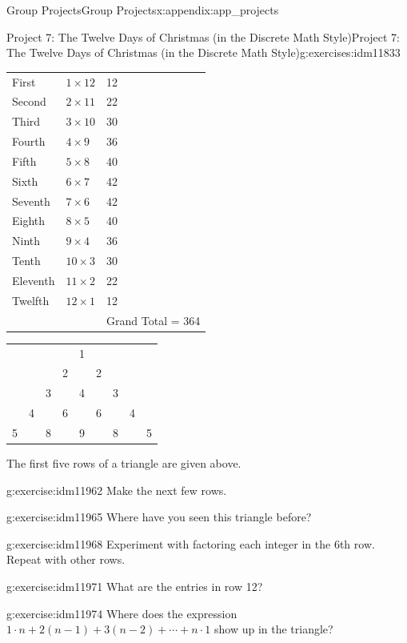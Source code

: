 \documentclass[oneside,10pt,]{book}
\numberwithin{equation}{chapter}
\begin{document}
\begin{appendixptx}{Group Projects}{}{Group Projects}{}{}{x:appendix:app_projects}
\begin{exercises-section-numberless}{Project 7: The Twelve Days of Christmas (in the Discrete Math Style)}{}{Project 7: The Twelve Days of Christmas (in the Discrete Math Style)}{}{}{g:exercises:idm11833}
\begin{introduction}{}
\begin{sidebyside}{1}{0.2}{0.2}{0}
\begin{sbspanel}{0.6}
{\begin{tabular}{lll}
First&\(1 \times 12\)&12\tabularnewline[0pt]
Second&\(2 \times 11\)&22\tabularnewline[0pt]
Third&\(3 \times 10\)&30\tabularnewline[0pt]
Fourth&\(4 \times 9\)&36\tabularnewline[0pt]
Fifth&\(5 \times 8\)&40\tabularnewline[0pt]
Sixth&\(6 \times 7\)&42\tabularnewline[0pt]
Seventh&\(7 \times 6\)&42\tabularnewline[0pt]
Eighth&\(8 \times 5\)&40\tabularnewline[0pt]
Ninth&\(9 \times 4\)&36\tabularnewline[0pt]
Tenth&\(10 \times 3\)&30\tabularnewline[0pt]
Eleventh&\(11 \times 2\)&22\tabularnewline[0pt]
Twelfth&\(12 \times 1\)&12\tabularnewline[0pt]
&&Grand Total = 364
\end{tabular}
\par}
\end{sbspanel}%
\end{sidebyside}%
\begin{sidebyside}{1}{0.1}{0.1}{0}%
\begin{sbspanel}{0.8}%
{\centering%
\begin{tabular}{lllllllll}
&&&&1&&&&\tabularnewline[0pt]
&&&2&&2&&&\tabularnewline[0pt]
&&3&&4&&3&&\tabularnewline[0pt]
&4&&6&&6&&4&\tabularnewline[0pt]
5&&8&&9&&8&&5
\end{tabular}
\par}
\end{sbspanel}%
\end{sidebyside}%
\par
The first five rows of a triangle are given above.%
\end{introduction}%
\begin{divisionexercise}{1}{}{}{g:exercise:idm11962}%
Make the next few rows.%
\end{divisionexercise}%
\begin{divisionexercise}{2}{}{}{g:exercise:idm11965}%
Where have you seen this triangle before?%
\end{divisionexercise}%
\begin{divisionexercise}{3}{}{}{g:exercise:idm11968}%
Experiment with factoring each integer in the 6th row. Repeat with other rows.%
\end{divisionexercise}%
\begin{divisionexercise}{4}{}{}{g:exercise:idm11971}%
What are the entries in row 12?%
\end{divisionexercise}%
\begin{divisionexercise}{5}{}{}{g:exercise:idm11974}%
Where does the expression \(1 \cdot n + 2\left( n - 1 \right) + 3\left( n - 2 \right) + \cdots + n \cdot 1\) show up in the triangle?%
\end{divisionexercise}%

\end{exercises-section-numberless}
\end{appendixptx}
\end{document}

